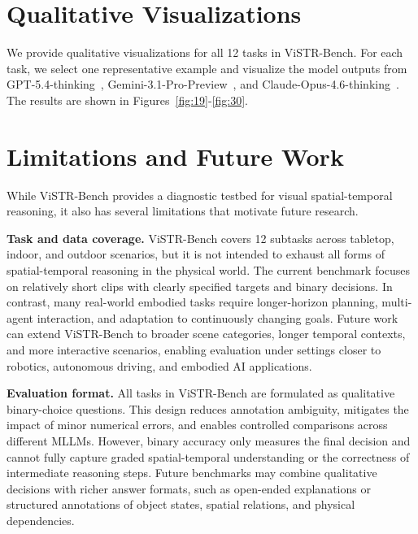 \section{Qualitative Visualizations}
\label{sec:visualization}

We provide qualitative visualizations for all 12 tasks in ViSTR-Bench.
For each task, we select one representative example and visualize the model outputs from GPT-5.4-thinking~\citep{GPT-5}, Gemini-3.1-Pro-Preview~\citep{Gemini}, and Claude-Opus-4.6-thinking~\citep{Claude}.
The results are shown in Figures~\ref{fig:19}-\ref{fig:30}.

\section{Limitations and Future Work}
\label{sec:limitations_future_work}

While ViSTR-Bench provides a diagnostic testbed for visual spatial-temporal reasoning, it also has several limitations that motivate future research.

\noindent\textbf{Task and data coverage.}
ViSTR-Bench covers 12 subtasks across tabletop, indoor, and outdoor scenarios, but it is not intended to exhaust all forms of spatial-temporal reasoning in the physical world.
The current benchmark focuses on relatively short clips with clearly specified targets and binary decisions.
In contrast, many real-world embodied tasks require longer-horizon planning, multi-agent interaction, and adaptation to continuously changing goals.
Future work can extend ViSTR-Bench to broader scene categories, longer temporal contexts, and more interactive scenarios, enabling evaluation under settings closer to robotics, autonomous driving, and embodied AI applications.

\noindent\textbf{Evaluation format.}
All tasks in ViSTR-Bench are formulated as qualitative binary-choice questions.
This design reduces annotation ambiguity, mitigates the impact of minor numerical errors, and enables controlled comparisons across different MLLMs.
However, binary accuracy only measures the final decision and cannot fully capture graded spatial-temporal understanding or the correctness of intermediate reasoning steps.
Future benchmarks may combine qualitative decisions with richer answer formats, such as open-ended explanations or structured annotations of object states, spatial relations, and physical dependencies.

